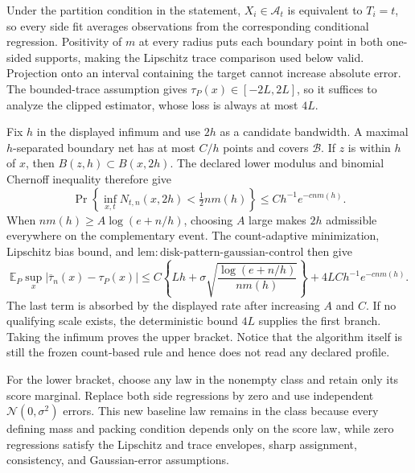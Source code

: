 Under the partition condition in the statement, \(X_i\in\mathcal A_t\) is equivalent to \(T_i=t\), so every side fit averages observations from the corresponding conditional regression. Positivity of \(m\) at every radius puts each boundary point in both one-sided supports, making the Lipschitz trace comparison used below valid. Projection onto an interval containing the target cannot increase absolute error. The bounded-trace assumption gives \(\tau_P(x)\in[-2L,2L]\), so it suffices to analyze the clipped estimator, whose loss is always at most \(4L\).

Fix \(h\) in the displayed infimum and use \(2h\) as a candidate bandwidth. A maximal \(h\)-separated boundary net has at most \(C/h\) points and covers \(\mathcal B\). If \(z\) is within \(h\) of \(x\), then \(B(z,h)\subset B(x,2h)\). The declared lower modulus and binomial Chernoff inequality therefore give
\[
 \Pr\left\{\inf_{x,t}N_{t,n}(x,2h)<\tfrac12nm(h)\right\}
 \le Ch^{-1}e^{-cnm(h)}.
\]
When \(nm(h)\ge A\log(e+n/h)\), choosing \(A\) large makes \(2h\) admissible everywhere on the complementary event. The count-adaptive minimization, Lipschitz bias bound, and \(\mathrm{lem:disk\text{-}pattern\text{-}gaussian\text{-}control}\) then give
\[
 \mathbb E_P\sup_x|\overline\tau_n(x)-\tau_P(x)|
 \le C\left\{Lh+\sigma\sqrt{\frac{\log(e+n/h)}{nm(h)}}\right\}
 +4LCh^{-1}e^{-cnm(h)}.
\]
The last term is absorbed by the displayed rate after increasing \(A\) and \(C\). If no qualifying scale exists, the deterministic bound \(4L\) supplies the first branch. Taking the infimum proves the upper bracket. Notice that the algorithm itself is still the frozen count-based rule and hence does not read any declared profile.

For the lower bracket, choose any law in the nonempty class and retain only its score marginal. Replace both side regressions by zero and use independent \(\mathcal N(0,\sigma^2)\) errors. This new baseline law remains in the class because every defining mass and packing condition depends only on the score law, while zero regressions satisfy the Lipschitz and trace envelopes, sharp assignment, consistency, and Gaussian-error assumptions.

